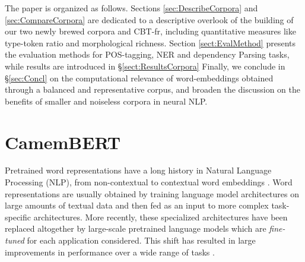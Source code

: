 The paper is organized as follows. Sections \ref{sec:DescribeCorpora} and \ref{sec:CompareCorpora} are dedicated to a descriptive overlook of the building of our two newly brewed corpora \Cabernet and CBT-fr, including quantitative measures like type-token ratio and morphological richness. %
Section \ref{sect:EvalMethod} presents the evaluation methods for POS-tagging, NER and dependency Parsing tasks, while results are introduced in §\ref{sect:ResultsCorpora}
Finally, we conclude in §\ref{sec:Concl} on the computational relevance of word-embeddings obtained through a balanced and representative corpus, and broaden the discussion on the benefits of smaller and noiseless corpora in neural NLP.%



\section{CamemBERT}

Pretrained word representations have a long history in Natural Language Processing (NLP), from non-contextual \citep{brown-etal-1992-class,ando-zhang-2005-framework,mikolov-etal-2013-distributed,pennington-etal-2014-glove} to contextual word embeddings \citep{peters-etal-2018-deep,akbik-etal-2018-contextual}. Word representations are usually obtained by training language model architectures on large amounts of textual data and then fed as an input to more complex task-specific architectures. More recently, these specialized architectures have been replaced altogether by large-scale pretrained language models which are \emph{fine-tuned} for each application considered. This shift has resulted in large improvements in performance over a wide range of tasks \cite{devlin-etal-2019-bert,radford-etal-2019-language,liu-etal-2019-roberta,raffel-etal-2020-exploring}.

